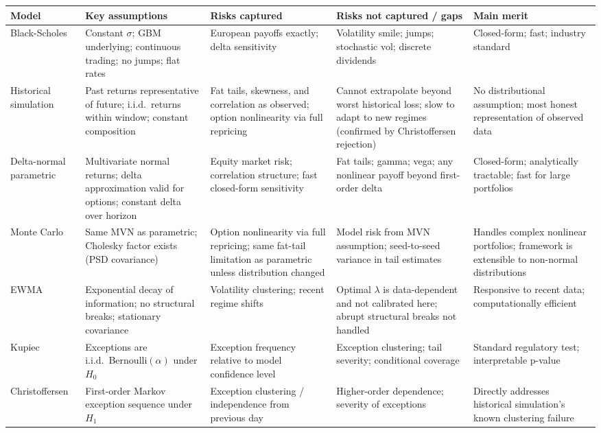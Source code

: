 \documentclass[11pt]{article}
\begin{document}
\begin{center}
\footnotesize
\begin{tabular}{L{1.8cm}L{3.5cm}L{3.0cm}L{3.5cm}L{2.5cm}}
\toprule
\textbf{Model}
  & \textbf{Key assumptions}
  & \textbf{Risks captured}
  & \textbf{Risks not captured / gaps}
  & \textbf{Main merit} \\
\midrule
Black-Scholes
  & Constant $\sigma$; GBM underlying; continuous trading; no jumps; flat rates
  & European payoffs exactly; delta sensitivity
  & Volatility smile; jumps; stochastic vol; discrete dividends
  & Closed-form; fast; industry standard \\[4pt]
Historical simulation
  & Past returns representative of future; i.i.d.\ returns within window; constant composition
  & Fat tails, skewness, and correlation as observed; option nonlinearity via full repricing
  & Cannot extrapolate beyond worst historical loss; slow to adapt to new regimes (confirmed by Christoffersen rejection)
  & No distributional assumption; most honest representation of observed data \\[4pt]
Delta-normal parametric
  & Multivariate normal returns; delta approximation valid for options; constant delta over horizon
  & Equity market risk; correlation structure; fast closed-form sensitivity
  & Fat tails; gamma; vega; any nonlinear payoff beyond first-order delta
  & Closed-form; analytically tractable; fast for large portfolios \\[4pt]
Monte Carlo
  & Same MVN as parametric; Cholesky factor exists (PSD covariance)
  & Option nonlinearity via full repricing; same fat-tail limitation as parametric unless distribution changed
  & Model risk from MVN assumption; seed-to-seed variance in tail estimates
  & Handles complex nonlinear portfolios; framework is extensible to non-normal distributions \\[4pt]
EWMA
  & Exponential decay of information; no structural breaks; stationary covariance
  & Volatility clustering; recent regime shifts
  & Optimal $\lambda$ is data-dependent and not calibrated here; abrupt structural breaks not handled
  & Responsive to recent data; computationally efficient \\[4pt]
Kupiec
  & Exceptions are i.i.d.\ Bernoulli$(\alpha)$ under $H_0$
  & Exception frequency relative to model confidence level
  & Exception clustering; tail severity; conditional coverage
  & Standard regulatory test; interpretable p-value \\[4pt]
Christoffersen
  & First-order Markov exception sequence under $H_1$
  & Exception clustering / independence from previous day
  & Higher-order dependence; severity of exceptions
  & Directly addresses historical simulation's known clustering failure \\
\bottomrule
\end{tabular}
\end{center}
\end{document}
